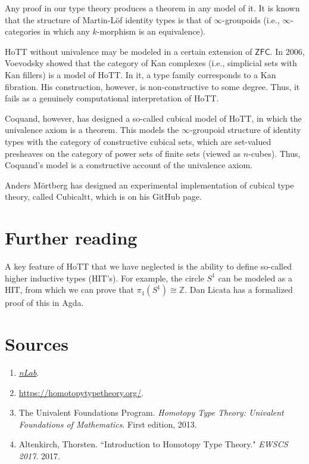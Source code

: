 \documentclass[10pt,letterpaper,cm]{nupset}
\theoremstyle{definition}
\theoremstyle{theorem}
\theoremstyle{remark}
\newcommand{\Z}{\mathbb Z}
\newcommand{\1}{\mathbf{1}}
\newcommand{\0}{\vec 0}
\begin{document}
Any proof in our type theory produces a theorem in any model of it. It is known that the structure of Martin-L\"of identity types is that of $\infty$-groupoids (i.e., $\infty$-categories in which any $k$-morphism is an equivalence).

HoTT without univalence may be modeled in a certain extension of $\mathsf{ZFC}$. In 2006, Voevodsky showed that the category of Kan complexes (i.e., simplicial sets with Kan fillers) is a model of HoTT.  In it, a type family corresponds to a Kan fibration.  His construction, however, is non-constructive to some degree. Thus, it fails as a genuinely computational interpretation of HoTT.

Coquand, however, has designed a so-called cubical model of HoTT, in which the univalence axiom is a theorem. This models the $\infty$-groupoid structure of identity types with the category of constructive cubical sets, which are set-valued presheaves on the category of power sets of finite sets (viewed as $n$-cubes). Thus, Coquand's model is a constructive account of the univalence axiom.  

Anders M\"ortberg has designed an experimental implementation of cubical type theory, called Cubicaltt, which is on his GitHub page.

\section*{Further reading}

A key feature of HoTT that we have neglected is the ability to define so-called higher inductive types (HIT's). For example, the circle $S^1$ can be modeled as a HIT, from which we can prove that $\pi_1(S^1) \cong \Z$. Dan Licata has a formalized proof of this in Agda.

\section*{Sources}

\begin{enumerate}
\item \href{https://ncatlab.org/nlab/show/HomePage}{\textit{nLab}}.
\item \url{https://homotopytypetheory.org/}.
\item The Univalent Foundations Program. \textit{Homotopy Type Theory: Univalent Foundations of Mathematics}. First edition, 2013.
\item Altenkirch, Thorsten. ``Introduction to Homotopy Type Theory." \textit{EWSCS 2017}. 2017.
\end{enumerate}
\end{document}
